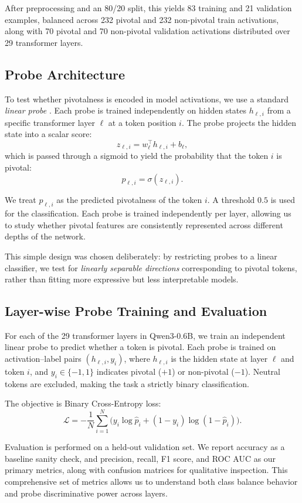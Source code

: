 \documentclass{article}
\begin{document}
After preprocessing and an 80/20 split, this yields 83 training and 21 validation examples, balanced across 232 pivotal and 232 non-pivotal train activations, along with 70 pivotal and 70 non-pivotal validation activations distributed over 29 transformer layers.



\subsection{Probe Architecture}
To test whether pivotalness is encoded in model activations, we use a standard \textit{linear probe} \citep{alain2018understandingintermediatelayersusing}. Each probe is trained independently on hidden states $h_{\ell,i}$ from a specific transformer layer $\ell$ at a token position $i$. The probe projects the hidden state into a scalar score:
\[
z_{\ell,i} = w_\ell^\top h_{\ell,i} + b_\ell ,
\]
which is passed through a sigmoid to yield the probability that the token $i$ is pivotal:
\[
p_{\ell,i} = \sigma(z_{\ell,i}).
\]

We treat $p_{\ell,i}$ as the predicted pivotalness of the token $i$. A threshold $0.5$ is used for the classification. Each probe is trained independently per layer, allowing us to study whether pivotal features are consistently represented across different depths of the network.

This simple design was chosen deliberately: by restricting probes to a linear classifier, we test for \textit{linearly separable directions} corresponding to pivotal tokens, rather than fitting more expressive but less interpretable models.


\subsection{Layer-wise Probe Training and Evaluation}
For each of the 29 transformer layers in Qwen3-0.6B, we train an independent linear probe to predict whether a token is pivotal. Each probe is trained on activation–label pairs $(h_{\ell,i}, y_i)$, where $h_{\ell,i}$ is the hidden state at layer $\ell$ and token $i$, and $y_i \in \{-1,1\}$ indicates pivotal ($+1$) or non-pivotal ($-1$). Neutral tokens are excluded, making the task a strictly binary classification.

The objective is Binary Cross-Entropy loss:
\[
\mathcal{L} = -\frac{1}{N} \sum_{i=1}^{N} \Big( y_i \log \hat{p}_i + (1 - y_i) \log (1 - \hat{p}_i) \Big).
\]

Evaluation is performed on a held-out validation set. We report accuracy as a baseline sanity check, and precision, recall, F1 score, and ROC AUC as our primary metrics, along with confusion matrices for qualitative inspection. This comprehensive set of metrics allows us to understand both class balance behavior and probe discriminative power across layers.
\end{document}
